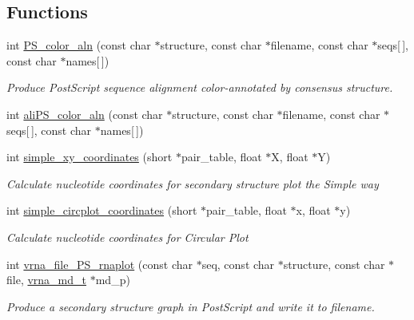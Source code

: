 \subsection*{Functions}
\begin{DoxyCompactItemize}
\item 
\hypertarget{group__plotting__utils_ga821802c3685e37e15182341f6217470d}{}int \hyperlink{group__plotting__utils_ga821802c3685e37e15182341f6217470d}{P\+S\+\_\+color\+\_\+aln} (const char $\ast$structure, const char $\ast$filename, const char $\ast$seqs\mbox{[}$\,$\mbox{]}, const char $\ast$names\mbox{[}$\,$\mbox{]})\label{group__plotting__utils_ga821802c3685e37e15182341f6217470d}

\begin{DoxyCompactList}\small\item\em Produce Post\+Script sequence alignment color-\/annotated by consensus structure. \end{DoxyCompactList}\item 
int \hyperlink{group__plotting__utils_gaab48d4dac655d688abe921389ac2847c}{ali\+P\+S\+\_\+color\+\_\+aln} (const char $\ast$structure, const char $\ast$filename, const char $\ast$seqs\mbox{[}$\,$\mbox{]}, const char $\ast$names\mbox{[}$\,$\mbox{]})
\item 
int \hyperlink{group__plotting__utils_gaf4b9173e7d3fd361c3c85e6def194123}{simple\+\_\+xy\+\_\+coordinates} (short $\ast$pair\+\_\+table, float $\ast$X, float $\ast$Y)
\begin{DoxyCompactList}\small\item\em Calculate nucleotide coordinates for secondary structure plot the {\itshape Simple way} \end{DoxyCompactList}\item 
int \hyperlink{group__plotting__utils_gac4ea13d35308f09940178d2b05a248c2}{simple\+\_\+circplot\+\_\+coordinates} (short $\ast$pair\+\_\+table, float $\ast$x, float $\ast$y)
\begin{DoxyCompactList}\small\item\em Calculate nucleotide coordinates for {\itshape Circular Plot} \end{DoxyCompactList}\item 
int \hyperlink{group__plotting__utils_gabdc8f6548ba4a3bc3cd868ccbcfdb86a}{vrna\+\_\+file\+\_\+\+P\+S\+\_\+rnaplot} (const char $\ast$seq, const char $\ast$structure, const char $\ast$file, \hyperlink{group__model__details_ga1f8a10e12a0a1915f2a4eff0b28ea17c}{vrna\+\_\+md\+\_\+t} $\ast$md\+\_\+p)
\begin{DoxyCompactList}\small\item\em Produce a secondary structure graph in Post\+Script and write it to \textquotesingle{}filename\textquotesingle{}. \end{DoxyCompactList}\item 

\end{DoxyCompactItemize}
